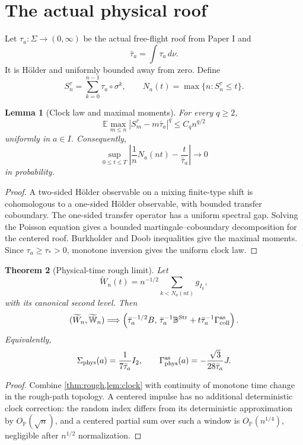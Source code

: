 \documentclass[11pt,reqno]{amsart}
\newtheorem{theorem}{Theorem}[section]
\newtheorem{lemma}[theorem]{Lemma}
\theoremstyle{definition}
\theoremstyle{remark}
\newcommand{\E}{\mathbb E}
\newcommand{\Pp}{\mathbb P}
\newcommand{\abs}[1]{\left\lvert #1\right\rvert}
\begin{document}
\section{The actual physical roof}\label{sec:roof}

Let $\tau_a:\Sigma\to(0,\infty)$ be the actual free-flight roof from Paper I
and
\[
 \bar\tau_a=\int\tau_a\,d\nu.
\]
It is Hölder and uniformly bounded away from zero.  Define
\[
 S_n^\tau=\sum_{k=0}^{n-1}\tau_a\circ\sigma^k,\qquad
 N_a(t)=\max\{n:S_n^\tau\le t\}.
\]

\begin{lemma}[Clock law and maximal moments]\label{lem:clock}
For every $q\ge2$,
\[
 \E\max_{m\le n}
 \abs{S_m^\tau-m\bar\tau_a}^q
 \le C_qn^{q/2}
\]
uniformly in $a\in I$.  Consequently,
\[
 \sup_{0\le t\le T}
 \abs{\frac1nN_a(nt)-\frac{t}{\bar\tau_a}}
 \longrightarrow0
\]
in probability.
\end{lemma}

\begin{proof}
A two-sided Hölder observable on a mixing finite-type shift is cohomologous to
a one-sided Hölder observable, with bounded transfer coboundary.  The
one-sided transfer operator has a uniform spectral gap.  Solving the Poisson
equation gives a bounded martingale--coboundary decomposition for the centered
roof.  Burkholder and Doob inequalities give the maximal moments.  Since
$\tau_a\ge\tau_*>0$, monotone inversion gives the uniform clock law.
\end{proof}

\begin{theorem}[Physical-time rough limit]\label{thm:physical-rough}
Let
\[
 \widetilde W_n(t)
 =n^{-1/2}\sum_{k<N_a(nt)}g_{I_k},
\]
with its canonical second level.  Then
\[
 (\widetilde W_n,\widetilde{\mathbb W}_n)
 \Longrightarrow
 \left(
 \bar\tau_a^{-1/2}B,\,
 \bar\tau_a^{-1}\mathbb B^{\rm Str}
 +t\bar\tau_a^{-1}\Gamma_{\rm coll}^{\rm as}
 \right).
\]
Equivalently,
\[
 \Sigma_{\rm phys}(a)=\frac1{7\bar\tau_a}I_2,\qquad
 \Gamma_{\rm phys}^{\rm as}(a)
 =-\frac{\sqrt3}{28\bar\tau_a}J.
\]
\end{theorem}

\begin{proof}
Combine \cref{thm:rough,lem:clock} with continuity of monotone time change in
the rough-path topology.  A centered impulse has no additional deterministic
clock correction: the random index differs from its deterministic
approximation by $O_{\Pp}(\sqrt n)$, and a centered partial sum over such a
window is $O_{\Pp}(n^{1/4})$, negligible after $n^{1/2}$ normalization.
\end{proof}
\end{document}
